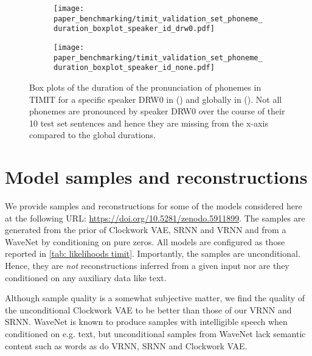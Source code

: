 {\begin{figure}
    \centering
    \hfill
    \begin{subfigure}[b]{\textwidth}
        \centering
        \texttt{[image: paper\_benchmarking/timit\_validation\_set\_phoneme\_duration\_boxplot\_speaker\_id\_drw0.pdf]}
        \caption{}
        \label{fig: timit validation set phoneme duration DRW0}
    \end{subfigure}
    \begin{subfigure}[b]{\textwidth}
        \centering
        \texttt{[image: paper\_benchmarking/timit\_validation\_set\_phoneme\_duration\_boxplot\_speaker\_id\_none.pdf]}
        \caption{}
        \label{fig: timit validation set phoneme duration global}
    \end{subfigure}
    \caption[Box plots of duration of phoneme pronunciation in TIMIT.]{ Box plots of the duration of the pronunciation of phonemes in TIMIT for a specific speaker DRW0 in () and globally in (). Not all phonemes are pronounced by speaker DRW0 over the course of their 10 test set sentences and hence they are missing from the x-axis compared to the global durations.}
    \label{fig: timit validation set phoneme duration}
\end{figure}

\section{Model samples and reconstructions}\label{app: model samples and reconstructions}
We provide samples and reconstructions for some of the models considered here at the following URL: \url{https://doi.org/10.5281/zenodo.5911899}.
The samples are generated from the prior of Clockwork VAE, SRNN and VRNN and from a WaveNet by conditioning on pure zeros. All models are configured as those reported in \cref{tab: likelihoods timit}.
Importantly, the samples are unconditional. Hence, they are \emph{not} reconstructions inferred from a given input nor are they conditioned on any auxiliary data like text.

Although sample quality is a somewhat subjective matter, we find the quality of the unconditional Clockwork VAE to be better than those of our VRNN and SRNN. WaveNet is known to produce samples with intelligible speech when conditioned on e.g. text, but unconditional samples from WaveNet lack semantic content such as words as do VRNN, SRNN and Clockwork VAE.

}